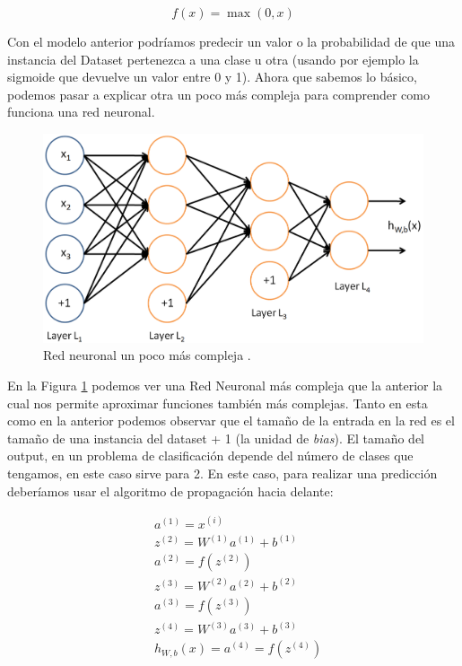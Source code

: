 \begin{equation}
	f(x) = \max (0, x)
	\label{eq:RELU}
\end{equation}

Con el modelo anterior podríamos predecir un valor o la probabilidad de que una instancia del Dataset pertenezca a una clase u otra (usando por ejemplo la sigmoide que devuelve un valor entre 0 y 1). Ahora que sabemos lo básico, podemos pasar a explicar otra un poco más compleja para comprender como funciona una red neuronal. \newline

\begin{figure}[H]
	\includegraphics[scale=0.2]{imagenes/03_Estado_del_arte/complexnn.png}
	\centering
	\caption{Red neuronal un poco más compleja \cite{ng}.}
	\label{fig:complexnn}
\end{figure}

En la Figura \ref{fig:complexnn} podemos ver una Red Neuronal más compleja que la anterior la cual nos permite aproximar funciones también más complejas. Tanto en esta como en la anterior podemos observar que el tamaño de la entrada en la red es el tamaño de una instancia del dataset + 1 (la unidad de \textit{bias}). El tamaño del output, en un problema de clasificación depende del número de clases que tengamos, en este caso sirve para 2. En este caso, para realizar una predicción deberíamos usar el algoritmo de propagación hacia delante:

\begin{align*}
&a^{(1)} = x^{(i)} \\
&z^{(2)} = W^{(1)}a^{(1)} + b^{(1)} \\
&a^{(2)} = f(z^{(2)}) \\
&z^{(3)} = W^{(2)}a^{(2)} + b^{(2)} \\
&a^{(3)} = f(z^{(3)}) \\
&z^{(4)} = W^{(3)}a^{(3)} + b^{(3)} \\
&h_{W,b}(x) = a^{(4)} = f(z^{(4)})\\
\end{align*}

